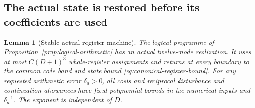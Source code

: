 \documentclass[11pt,a4paper]{amsart}
\newtheorem{lemma}[theorem]{Lemma}
\theoremstyle{definition}
\theoremstyle{remark}
\numberwithin{equation}{section}
\begin{document}
\subsection{The actual state is restored before its coefficients are used}
\begin{lemma}[Stable actual register machine]\label{lem:register-machine}
The logical programme of Proposition~\ref{prop:logical-arithmetic} has an
actual twelve-mode realization.  It uses at most $C(D+1)^3$ whole-register
assignments and returns at every boundary to the common code band and
state bound \eqref{eq:canonical-register-bound}.  For any requested
arithmetic error $\delta_a>0$, all costs and reciprocal disturbance and
continuation allowances have fixed polynomial bounds in the numerical
inputs and $\delta_a^{-1}$.  The exponent is independent of $D$.
\end{lemma}
\end{document}
